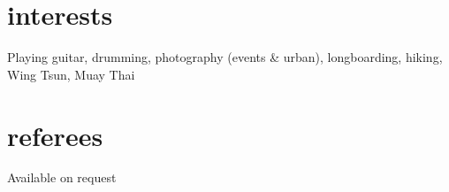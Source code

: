 \documentclass[]{friggeri-cv} %
\begin{document}
\section{interests}

Playing guitar, drumming, photography (events \& urban), longboarding, hiking, Wing Tsun, Muay Thai


\section{referees}

Available on request
\end{document}
